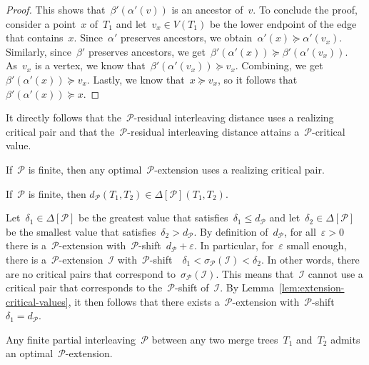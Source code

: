 \documentclass[a4paper,UKenglish, autoref, thm-restate, cleveref]{lipics-v2021}
\newcommand{\shift}[1]{\sigma_{#1}}
\newcommand{\resdist}[1]{d_{#1}}
\newcommand{\eps}{\varepsilon}
\newcommand{\I}{\mathcal{I}}
\renewcommand{\P}{\mathcal{P}}
\begin{document}
\begin{proof}
    \noindent
    This shows that~$\beta'(\alpha'(v))$ is an ancestor of~$v$.
    To conclude the proof, consider a point~$x$ of~$T_1$ and let~$v_x \in V(T_1)$ be the lower endpoint of the edge that contains~$x$.
	Since~$\alpha'$ preserves ancestors, we obtain~$\alpha'(x) \succeq \alpha'(v_x)$.
	Similarly, since~$\beta'$ preserves ancestors, we get~$\beta'(\alpha'(x)) \succeq \beta'(\alpha'(v_x))$.
	As~$v_x$ is a vertex, we know that~$\beta'(\alpha'(v_x)) \succeq v_x$.
	Combining, we get~$\beta'(\alpha'(x)) \succeq v_x$.
	Lastly, we know that~$x \succeq v_x$, so it follows that~$\beta'(\alpha'(x)) \succeq x$.
\end{proof}

\noindent
It directly follows that the~$\P$-residual interleaving distance uses a realizing critical pair and that the~$\P$-residual interleaving distance attains a~$\P$-critical value.

\begin{corollary}\label{cor:using-critical-pair}
    If~$\P$ is finite, then any optimal~$\P$-extension uses a realizing critical pair.
\end{corollary}

\begin{corollary}\label{cor:critical-values}
	If~$\P$ is finite, then $\resdist{\P}(T_1, T_2) \in \Delta[\P](T_1, T_2)$.
\end{corollary}

\noindent
Let~$\delta_1 \in \Delta[\P]$ be the greatest value that satisfies~$\delta_1 \le \resdist{\P}$ and let~$ \delta_2 \in \Delta[\P]$ be the smallest value that satisfies~$\delta_2 > \resdist{\P}$.
By definition of~$\resdist{\P}$, for all~$\eps > 0$ there is a~$\P$-extension with~$\P$-shift~$\resdist{\P} + \eps$.
In particular, for~$\eps$ small enough, there is a~$\P$-extension~$\I$ with~$\P$-shift~~$\delta_1 < \shift{\P}(\I) < \delta_2$.
In other words, there are no critical pairs that correspond to~$\shift{\P}(\I)$. 
This means that~$\I$ cannot use a critical pair that corresponds to the~$\P$-shift of~$\I$.
By Lemma~\ref{lem:extension-critical-values}, it then follows that there exists a~$\P$-extension with~$\P$-shift~$\delta_1 = \resdist{\P}$.

\begin{theorem}\label{thm:existence-optimal-extension}
	Any finite partial interleaving~$\P$ between any two merge trees~$T_1$ and~$T_2$ admits an optimal~$\P$-extension.
\end{theorem}
\end{document}
